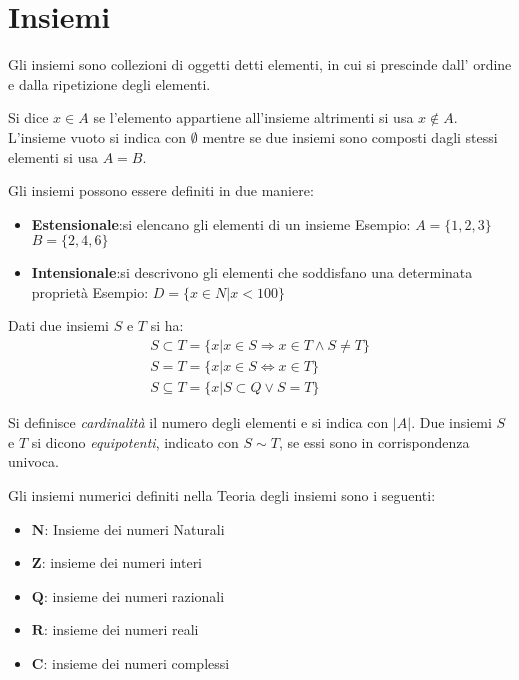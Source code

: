 \chapter{Insiemi}
Gli insiemi sono collezioni di oggetti detti elementi, in cui si prescinde dall'
ordine e dalla ripetizione degli elementi.

Si dice $x \in A$ se l'elemento appartiene all'insieme altrimenti si usa $x \not \in A$.
L'insieme vuoto si indica con $\emptyset$ mentre se due insiemi sono composti dagli stessi
elementi si usa $A = B$.

Gli insiemi possono essere definiti in due maniere:

\begin{itemize}
  \item \textbf{Estensionale}:si elencano gli elementi di un insieme\newline
        Esempio:\newline
        $A = \{1,2,3\}$\newline
        $B = \{2,4,6\}$\newline
  \item \textbf{Intensionale}:si descrivono gli elementi che soddisfano una determinata proprietà\newline
        Esempio: \newline
        $D = \{x \in N | x < 100\}$
\end{itemize}

Dati due insiemi $S$ e $T$ si ha:
\begin{multline}
  S \subset T = \{x | x \in S \Rightarrow x \in T \land S \not = T \} \\
  S = T  = \{x | x \in S \iff x \in T \} \\
  S \subseteq T = \{x | S \subset Q \lor S = T \}
\end{multline}


Si definisce \textit{cardinalità} il numero degli elementi e si indica con $|A|$.\newline
Due insiemi $S$ e $T$ si dicono \textit{equipotenti}, indicato con $S \sim T$, se
essi sono in corrispondenza univoca.

Gli insiemi numerici definiti nella Teoria degli insiemi sono i seguenti: \newline
\begin{itemize}
  \item $\mathbf{N}$: Insieme dei numeri Naturali
  \item $\mathbf{Z}$: insieme dei numeri interi
  \item $\mathbf{Q}$: insieme dei numeri razionali
  \item $\mathbf{R}$: insieme dei numeri reali
  \item $\mathbf{C}$: insieme dei numeri complessi
\end{itemize}

